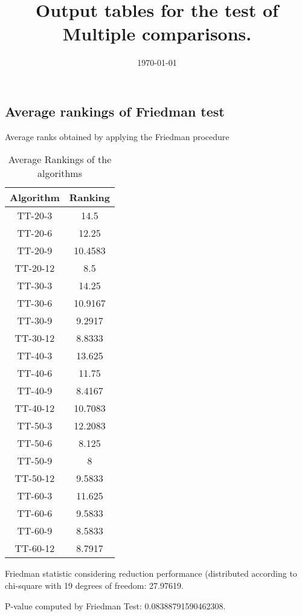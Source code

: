 \documentclass[a4paper,10pt]{article}
\title{Output tables for the test of Multiple comparisons.}
\author{}
\date{\today}
\begin{document}
\begin{landscape}
\pagestyle{empty}
\maketitle
\thispagestyle{empty}
\section{Average rankings of Friedman test}



Average ranks obtained by applying the Friedman procedure

\begin{table}[!htp]
\centering
\begin{tabular}{|c|c|}\hline
Algorithm&Ranking\\\hline
TT-20-3 & 14.5\\
TT-20-6 & 12.25\\
TT-20-9 & 10.4583\\
TT-20-12 & 8.5\\
TT-30-3 & 14.25\\
TT-30-6 & 10.9167\\
TT-30-9 & 9.2917\\
TT-30-12 & 8.8333\\
TT-40-3 & 13.625\\
TT-40-6 & 11.75\\
TT-40-9 & 8.4167\\
TT-40-12 & 10.7083\\
TT-50-3 & 12.2083\\
TT-50-6 & 8.125\\
TT-50-9 & 8\\
TT-50-12 & 9.5833\\
TT-60-3 & 11.625\\
TT-60-6 & 9.5833\\
TT-60-9 & 8.5833\\
TT-60-12 & 8.7917\\
\hline
\end{tabular}
\caption{Average Rankings of the algorithms}
\end{table}

Friedman statistic considering reduction performance (distributed according to chi-square with 19 degrees of freedom: 27.97619.

P-value computed by Friedman Test: 0.08388791590462308.\newline



\pagebreak


\end{landscape}
\end{document}
